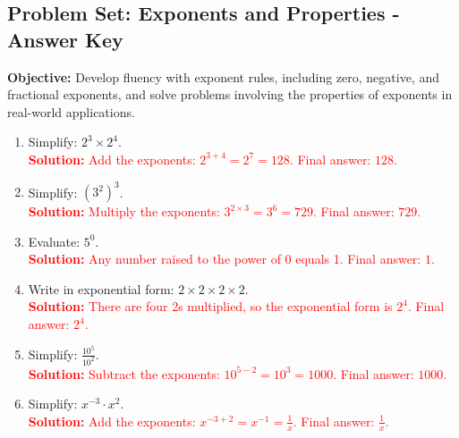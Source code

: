 \documentclass[9pt]{article}
\title{}
\date{}
\begin{document}
\subsection*{Problem Set: Exponents and Properties - Answer Key}
\onehalfspacing

\begin{tcolorbox}[colframe=black!40, colback=gray!5, 
coltitle=black, colbacktitle=black!20, fonttitle=\bfseries\Large, 
title=Learning Objective, halign title=center, left=5pt, right=5pt, top=5pt, bottom=15pt]
\textbf{Objective:} Develop fluency with exponent rules, including zero, negative, and fractional exponents, and solve problems involving the properties of exponents in real-world applications.
\end{tcolorbox}

\begin{tcolorbox}[colframe=black!60, colback=white, 
coltitle=black, colbacktitle=black!15, fonttitle=\bfseries\Large, 
title=Exercises, halign title=center, left=10pt, right=10pt, top=10pt, bottom=60pt]
\begin{enumerate}[itemsep=3em]
    \item Simplify: \( 2^3 \times 2^4 \).\\
    \textcolor{red}{\textbf{Solution:} Add the exponents: \(2^{3+4} = 2^7 = 128\). Final answer: \(128\).}

    \item Simplify: \( (3^2)^3 \).\\
    \textcolor{red}{\textbf{Solution:} Multiply the exponents: \(3^{2 \times 3} = 3^6 = 729\). Final answer: \(729\).}

    \item Evaluate: \( 5^0 \).\\
    \textcolor{red}{\textbf{Solution:} Any number raised to the power of 0 equals 1. Final answer: \(1\).}

    \item Write in exponential form: \( 2 \times 2 \times 2 \times 2 \).\\
    \textcolor{red}{\textbf{Solution:} There are four 2s multiplied, so the exponential form is \(2^4\). Final answer: \(2^4\).}

    \item Simplify: \( \frac{10^5}{10^2} \).\\
    \textcolor{red}{\textbf{Solution:} Subtract the exponents: \(10^{5-2} = 10^3 = 1000\). Final answer: \(1000\).}

    \item Simplify: \( x^{-3} \cdot x^2 \).\\
    \textcolor{red}{\textbf{Solution:} Add the exponents: \(x^{-3+2} = x^{-1} = \frac{1}{x}\). Final answer: \(\frac{1}{x}\).}


\end{enumerate}
\end{tcolorbox}
\end{document}
